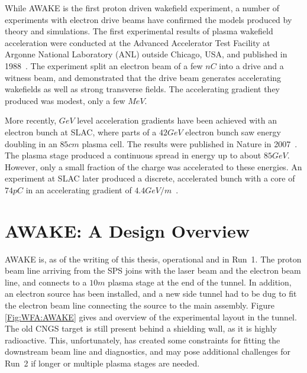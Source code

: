 While AWAKE is the first proton driven wakefield experiment, a number of experiments with electron drive beams have confirmed the models produced by theory and simulations.
The first experimental results of plasma wakefield acceleration were conducted at the Advanced Accelerator Test Facility at Argonne National Laboratory (ANL) outside Chicago, USA, and published in 1988~\cite{rosenzweig:1988}.
The experiment split an electron beam of a few $\unit{nC}$ into a drive and a witness beam, and demonstrated that the drive beam generates accelerating wakefields as well as strong transverse fields. The accelerating gradient they produced was modest, only a few $\unit{MeV}$.

More recently, $\unit{GeV}$ level acceleration gradients have been achieved with an electron bunch at SLAC, where parts of a $42\unit{GeV}$ electron bunch saw energy doubling in an $85\unit{cm}$ plasma cell.
The results were published in Nature in 2007~\cite{blumenfeld:2007}. The plasma stage produced a continuous spread in energy up to about $85\unit{GeV}$.
However, only a small fraction of the charge was accelerated to these energies.
An experiment at SLAC later produced a discrete, accelerated bunch with a core of $74\unit{pC}$ in an accelerating gradient of $4.4\unit{GeV/m}$~\cite{litos:2014}.


\section{AWAKE: A Design Overview}
\label{WFA:Design}

AWAKE is, as of the writing of this thesis, operational and in Run~1.
The proton beam line arriving from the SPS joins with the laser beam and the electron beam line, and connects to a $10\unit{m}$ plasma stage at the end of the tunnel.
In addition, an electron source has been installed, and a new side tunnel had to be dug to fit the electron beam line connecting the source to the main assembly.
Figure \ref{Fig:WFA:AWAKE} gives and overview of the experimental layout in the tunnel.
The old CNGS target is still present behind a shielding wall, as it is highly radioactive.
This, unfortunately, has created some constraints for fitting the downstream beam line and diagnostics, and may pose additional challenges for Run~2 if longer or multiple plasma stages are needed.

